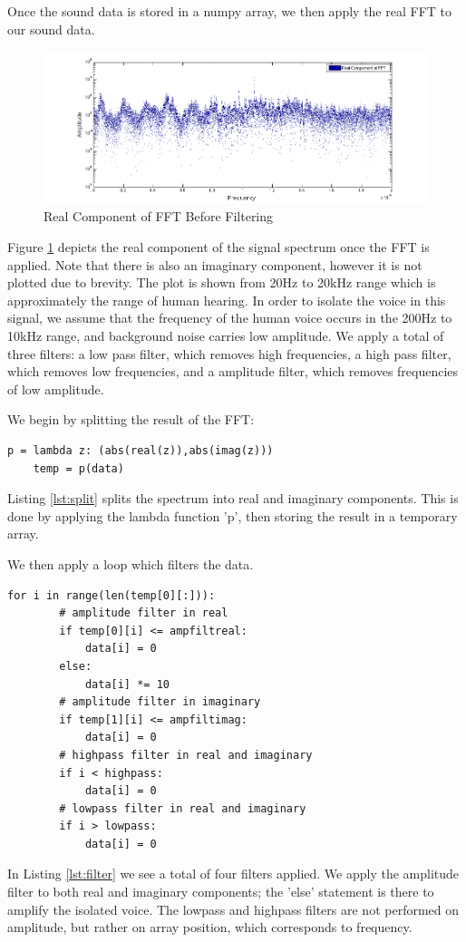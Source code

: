 Once the sound data is stored in a numpy array, we then apply the real FFT to our sound data.
\begin{figure}[H]
    \label{fig:beforeFilt}
    \centering
        \includegraphics[width=6.5in]{./include/beforefig.png}
        \caption{Real Component of FFT Before Filtering}
\end{figure}
Figure \ref{fig:beforeFilt} depicts the real component of the signal spectrum once the FFT is applied. Note that there is also an imaginary component, however it is not plotted due to brevity. The plot is shown from 20Hz to 20kHz range which is approximately the range of human hearing. In order to isolate the voice in this signal, we assume that the frequency of the human voice occurs in the 200Hz to 10kHz range, and background noise carries low amplitude. We apply a total of three filters: a low pass filter, which removes high frequencies, a high pass filter, which removes low frequencies, and a amplitude filter, which removes frequencies of low amplitude.

We begin by splitting the result of the FFT:
\begin{lstlisting}[caption={Splitting Spectrum into Real and Imaginary Components},label=lst:split,firstnumber=18]
    p = lambda z: (abs(real(z)),abs(imag(z)))
    temp = p(data)
\end{lstlisting}
Listing \ref{lst:split} splits the spectrum into real and imaginary components. This is done by applying the lambda function 'p', then storing the result in a temporary array.

We then apply a loop which filters the data.
\begin{lstlisting}[caption={Filter Application},label=lst:filter,firstnumber=21]
    for i in range(len(temp[0][:])):
        # amplitude filter in real
        if temp[0][i] <= ampfiltreal:
            data[i] = 0
        else:
            data[i] *= 10
        # amplitude filter in imaginary
        if temp[1][i] <= ampfiltimag:
            data[i] = 0
        # highpass filter in real and imaginary
        if i < highpass:
            data[i] = 0
        # lowpass filter in real and imaginary
        if i > lowpass:
            data[i] = 0
\end{lstlisting}
In Listing \ref{lst:filter} we see a total of four filters applied. We apply the amplitude filter to both real and imaginary components; the 'else' statement is there to amplify the isolated voice. The lowpass and highpass filters are not performed on amplitude, but rather on array position, which corresponds to frequency. 


